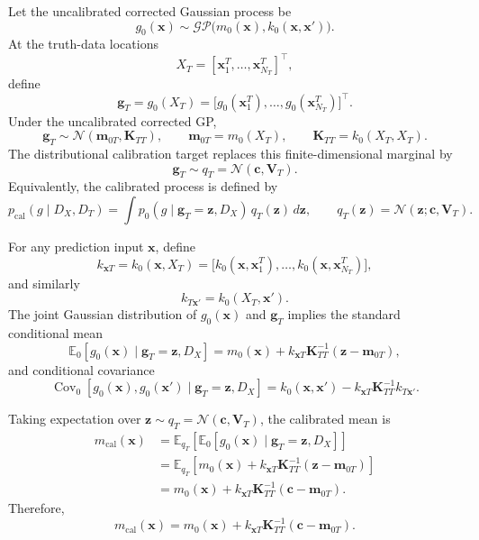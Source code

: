 \documentclass[journal]{new-aiaa}
\begin{document}
Let the uncalibrated corrected Gaussian process be
\[
g_0(\mathbf{x}) \sim \mathcal{GP}\bigl(m_0(\mathbf{x}),k_0(\mathbf{x},\mathbf{x}')\bigr).
\]
At the truth-data locations
\[
X_T = [\mathbf{x}_1^T,\ldots,\mathbf{x}_{N_T}^T]^\top,
\]
define
\[
\mathbf{g}_T
=
g_0(X_T)
=
\bigl[g_0(\mathbf{x}_1^T),\ldots,g_0(\mathbf{x}_{N_T}^T)\bigr]^\top .
\]
Under the uncalibrated corrected GP,
\[
\mathbf{g}_T \sim \mathcal{N}(\mathbf{m}_{0T},\mathbf{K}_{TT}),
\qquad
\mathbf{m}_{0T}=m_0(X_T),
\qquad
\mathbf{K}_{TT}=k_0(X_T,X_T).
\]
The distributional calibration target replaces this finite-dimensional marginal by
\[
\mathbf{g}_T \sim q_T
=
\mathcal{N}(\mathbf{c},\mathbf{V}_T).
\]
Equivalently, the calibrated process is defined by
\[
p_{\mathrm{cal}}(g\mid D_X,D_T)
=
\int
p_0(g\mid \mathbf{g}_T=\mathbf{z},D_X)\,
q_T(\mathbf{z})\,d\mathbf{z},
\qquad
q_T(\mathbf{z})=\mathcal{N}(\mathbf{z};\mathbf{c},\mathbf{V}_T).
\]

For any prediction input \(\mathbf{x}\), define
\[
k_{\mathbf{x}T}
=
k_0(\mathbf{x},X_T)
=
\bigl[
k_0(\mathbf{x},\mathbf{x}_1^T),
\ldots,
k_0(\mathbf{x},\mathbf{x}_{N_T}^T)
\bigr],
\]
and similarly
\[
k_{T\mathbf{x}'}
=
k_0(X_T,\mathbf{x}').
\]
The joint Gaussian distribution of \(g_0(\mathbf{x})\) and \(\mathbf{g}_T\) implies the
standard conditional mean
\[
\mathbb{E}_0
\left[
g_0(\mathbf{x})
\mid
\mathbf{g}_T=\mathbf{z},D_X
\right]
=
m_0(\mathbf{x})
+
k_{\mathbf{x}T}\mathbf{K}_{TT}^{-1}
(\mathbf{z}-\mathbf{m}_{0T}),
\]
and conditional covariance
\[
\operatorname{Cov}_0
\left[
g_0(\mathbf{x}),g_0(\mathbf{x}')
\mid
\mathbf{g}_T=\mathbf{z},D_X
\right]
=
k_0(\mathbf{x},\mathbf{x}')
-
k_{\mathbf{x}T}\mathbf{K}_{TT}^{-1}k_{T\mathbf{x}'}.
\]

Taking expectation over
\(\mathbf{z}\sim q_T=\mathcal{N}(\mathbf{c},\mathbf{V}_T)\), the calibrated mean is
\[
\begin{aligned}
m_{\mathrm{cal}}(\mathbf{x})
&=
\mathbb{E}_{q_T}
\left[
\mathbb{E}_0
\left[
g_0(\mathbf{x})
\mid
\mathbf{g}_T=\mathbf{z},D_X
\right]
\right] \\
&=
\mathbb{E}_{q_T}
\left[
m_0(\mathbf{x})
+
k_{\mathbf{x}T}\mathbf{K}_{TT}^{-1}
(\mathbf{z}-\mathbf{m}_{0T})
\right] \\
&=
m_0(\mathbf{x})
+
k_{\mathbf{x}T}\mathbf{K}_{TT}^{-1}
(\mathbf{c}-\mathbf{m}_{0T}).
\end{aligned}
\]
Therefore,
\[
\boxed{
m_{\mathrm{cal}}(\mathbf{x})
=
m_0(\mathbf{x})
+
k_{\mathbf{x}T}\mathbf{K}_{TT}^{-1}
(\mathbf{c}-\mathbf{m}_{0T})
}.
\]
\end{document}
